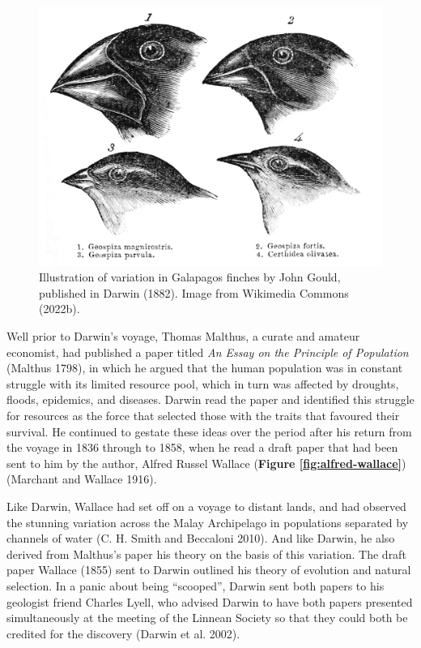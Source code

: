 \documentclass[
]{book}
\begin{document}
\begin{figure}

{\centering \includegraphics[width=1\linewidth]{figs/introduction/Darwin's_finches_by_Gould} 

}

\caption{Illustration of variation in Galapagos finches by John Gould, published in Darwin (1882). Image from Wikimedia Commons (2022b).}\label{fig:darwin-finches}
\end{figure}

Well prior to Darwin's voyage, Thomas Malthus, a curate and amateur economist, had published a paper titled \emph{An Essay on the Principle of Population} (Malthus 1798), in which he argued that the human population was in constant struggle with its limited resource pool, which in turn was affected by droughts, floods, epidemics, and diseases. Darwin read the paper and identified this struggle for resources as the force that selected those with the traits that favoured their survival. He continued to gestate these ideas over the period after his return from the voyage in 1836 through to 1858, when he read a draft paper that had been sent to him by the author, Alfred Russel Wallace (\textbf{Figure \ref{fig:alfred-wallace}}) (Marchant and Wallace 1916).

Like Darwin, Wallace had set off on a voyage to distant lands, and had observed the stunning variation across the Malay Archipelago in populations separated by channels of water (C. H. Smith and Beccaloni 2010). And like Darwin, he also derived from Malthus's paper his theory on the basis of this variation. The draft paper Wallace (1855) sent to Darwin outlined his theory of evolution and natural selection. In a panic about being ``scooped'', Darwin sent both papers to his geologist friend Charles Lyell, who advised Darwin to have both papers presented simultaneously at the meeting of the Linnean Society so that they could both be credited for the discovery (Darwin et al. 2002).
\end{document}
